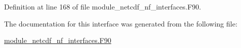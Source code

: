 Definition at line 168 of file module\+\_\+netcdf\+\_\+nf\+\_\+interfaces.\+F90.



The documentation for this interface was generated from the following file\+:\begin{DoxyCompactItemize}
\item 
\hyperlink{module__netcdf__nf__interfaces_8F90}{module\+\_\+netcdf\+\_\+nf\+\_\+interfaces.\+F90}\end{DoxyCompactItemize}
